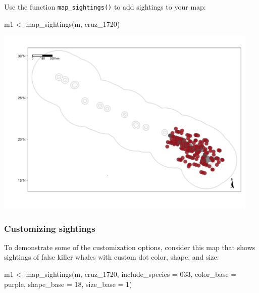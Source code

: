 \documentclass[
]{book}
\newenvironment{Shaded}{\begin{snugshade}}{\end{snugshade}}
\newcommand{\AttributeTok}[1]{\textcolor[rgb]{0.77,0.63,0.00}{#1}}
\newcommand{\DecValTok}[1]{\textcolor[rgb]{0.00,0.00,0.81}{#1}}
\newcommand{\FunctionTok}[1]{\textcolor[rgb]{0.00,0.00,0.00}{#1}}
\newcommand{\NormalTok}[1]{#1}
\newcommand{\OtherTok}[1]{\textcolor[rgb]{0.56,0.35,0.01}{#1}}
\newcommand{\StringTok}[1]{\textcolor[rgb]{0.31,0.60,0.02}{#1}}
\begin{document}
Use the function \texttt{map\_sightings()} to add sightings to your map:

\begin{Shaded}
\begin{Highlighting}[]
\NormalTok{m1 }\OtherTok{\textless{}{-}} \FunctionTok{map\_sightings}\NormalTok{(m, cruz\_1720)}
\end{Highlighting}
\end{Shaded}

\includegraphics[width=0.95\textwidth,height=\textheight]{img/map_sits.png}

\hypertarget{customizing-sightings}{%
\subsubsection*{Customizing sightings}\label{customizing-sightings}}

To demonstrate some of the customization options, consider this map that shows sightings of false killer whales with custom dot color, shape, and size:

\begin{Shaded}
\begin{Highlighting}[]
\NormalTok{m1 }\OtherTok{\textless{}{-}} \FunctionTok{map\_sightings}\NormalTok{(m,}
\NormalTok{                    cruz\_1720,}
                    \AttributeTok{include\_species =} \StringTok{\textquotesingle{}033\textquotesingle{}}\NormalTok{,}
                    \AttributeTok{color\_base =} \StringTok{\textquotesingle{}purple\textquotesingle{}}\NormalTok{,}
                    \AttributeTok{shape\_base =} \DecValTok{18}\NormalTok{,}
                    \AttributeTok{size\_base =} \DecValTok{1}\NormalTok{)}
\end{Highlighting}
\end{Shaded}
\end{document}
